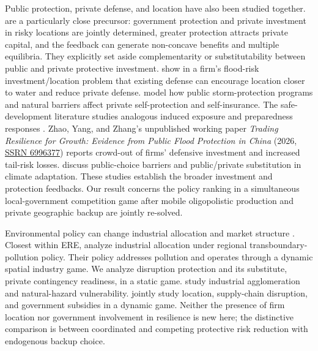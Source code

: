 Public protection, private defense, and location have also been studied together. \citet{KouskyLuttmerZeckhauser2006} are a particularly close precursor: government protection and private investment in risky locations are jointly determined, greater protection attracts private capital, and the feedback can generate non-concave benefits and multiple equilibria. They explicitly set aside complementarity or substitutability between public and private protective investment. \citet{GramesEtAl2019} show in a firm's flood-risk investment/location problem that existing defense can encourage location closer to water and reduce private defense. \citet{MahmudBarbier2016} model how public storm-protection programs and natural barriers affect private self-protection and self-insurance. The safe-development literature studies analogous induced exposure and preparedness responses \citep{HaerEtAl2020,FusinatoEtAl2024}. Zhao, Yang, and Zhang's unpublished working paper \emph{Trading Resilience for Growth: Evidence from Public Flood Protection in China} (2026, \href{https://doi.org/10.2139/ssrn.6996377}{SSRN 6996377}) reports crowd-out of firms' defensive investment and increased tail-risk losses. \citet{GawelEtAl2018} discuss public-choice barriers and public/private substitution in climate adaptation. These studies establish the broader investment and protection feedbacks. Our result concerns the policy ranking in a simultaneous local-government competition game after mobile oligopolistic production and private geographic backup are jointly re-solved.

Environmental policy can change industrial allocation and market structure \citep{MarkusenMoreyOlewiler1993,MarkusenMoreyOlewiler1995}. Closest within ERE, \citet{MartinHerranEtAl2026} analyze industrial allocation under regional transboundary-pollution policy. Their policy addresses pollution and operates through a dynamic spatial industry game. We analyze disruption protection and its substitute, private contingency readiness, in a static game. \citet{OtazawaEtAl2016} study industrial agglomeration and natural-hazard vulnerability. \citet{BacchiocchiEtAl2024} jointly study location, supply-chain disruption, and government subsidies in a dynamic game. Neither the presence of firm location nor government involvement in resilience is new here; the distinctive comparison is between coordinated and competing protective risk reduction with endogenous backup choice.

